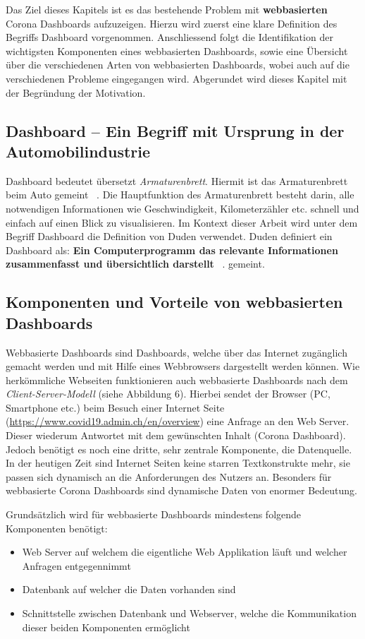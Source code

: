 \documentclass[12pt, oneside]{article}
\begin{document}
Das Ziel dieses Kapitels ist es das bestehende Problem mit \textbf{webbasierten} Corona Dashboards aufzuzeigen. Hierzu wird zuerst eine klare Definition des Begriffs Dashboard vorgenommen. Anschliessend folgt die Identifikation der wichtigsten Komponenten eines webbasierten Dashboards, sowie eine Übersicht über die verschiedenen Arten von webbasierten Dashboards, wobei auch auf die verschiedenen Probleme eingegangen wird. Abgerundet wird dieses Kapitel mit der Begründung der Motivation. 

\subsection{Dashboard – Ein Begriff mit Ursprung in der Automobilindustrie}
    Dashboard bedeutet übersetzt \textit{Armaturenbrett}. Hiermit ist das Armaturenbrett beim Auto gemeint ~\citep{Duden.18.04.2022}. Die Hauptfunktion des Armaturenbrett besteht darin, alle notwendigen Informationen wie Geschwindigkeit, Kilometerzähler etc. schnell und einfach auf einen Blick zu visualisieren. Im Kontext dieser Arbeit wird unter dem Begriff Dashboard die Definition von Duden verwendet. Duden definiert ein Dashboard als: \textbf{Ein Computerprogramm das relevante Informationen zusammenfasst und übersichtlich darstellt} ~\citep{Duden.18.04.2022}. gemeint.


\subsection{Komponenten und Vorteile von webbasierten Dashboards}
Webbasierte Dashboards sind Dashboards, welche über das Internet zugänglich gemacht werden und mit Hilfe eines Webbrowsers dargestellt werden können. Wie herkömmliche Webseiten funktionieren auch webbasierte Dashboards nach dem \textit{Client-Server-Modell} (siehe Abbildung 6). Hierbei sendet der Browser (PC, Smartphone etc.) beim Besuch einer Internet Seite (\url{https://www.covid19.admin.ch/en/overview}) eine Anfrage an den Web Server. Dieser wiederum Antwortet mit dem gewünschten Inhalt (Corona Dashboard). Jedoch benötigt es noch eine dritte, sehr zentrale Komponente, die Datenquelle. In der heutigen Zeit sind Internet Seiten keine starren Textkonstrukte mehr, sie passen sich dynamisch an die Anforderungen des Nutzers an. Besonders für webbasierte Corona Dashboards sind dynamische Daten von enormer Bedeutung. 

\clearpage
Grundsätzlich wird für webbasierte Dashboards mindestens folgende Komponenten benötigt:
\begin{itemize}
    \item Web Server auf welchem die eigentliche Web Applikation läuft und welcher Anfragen entgegennimmt
    \item Datenbank auf welcher die Daten vorhanden sind
    \item Schnittstelle zwischen Datenbank und Webserver, welche die Kommunikation dieser beiden Komponenten ermöglicht
\end{itemize}
\end{document}
